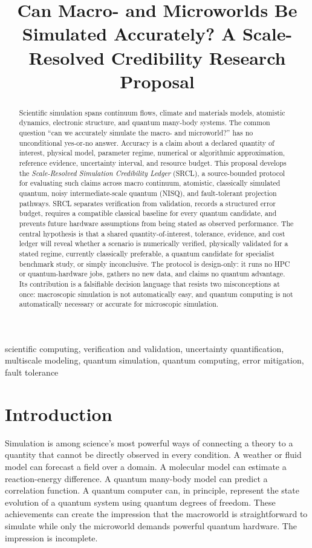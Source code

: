 \documentclass[conference]{../../../../Conference-LaTeX-template_10-17-19/IEEEtran}
\title{Can Macro- and Microworlds Be Simulated Accurately? A Scale-Resolved Credibility Research Proposal}
\author{\IEEEauthorblockN{Anonymous Research Proposal}}
\begin{document}
\maketitle

\begin{abstract}
Scientific simulation spans continuum flows, climate and materials models, atomistic dynamics, electronic structure, and quantum many-body systems. The common question ``can we accurately simulate the macro- and microworld?'' has no unconditional yes-or-no answer. Accuracy is a claim about a declared quantity of interest, physical model, parameter regime, numerical or algorithmic approximation, reference evidence, uncertainty interval, and resource budget. This proposal develops the \emph{Scale-Resolved Simulation Credibility Ledger} (SRCL), a source-bounded protocol for evaluating such claims across macro continuum, atomistic, classically simulated quantum, noisy intermediate-scale quantum (NISQ), and fault-tolerant projection pathways. SRCL separates verification from validation, records a structured error budget, requires a compatible classical baseline for every quantum candidate, and prevents future hardware assumptions from being stated as observed performance. The central hypothesis is that a shared quantity-of-interest, tolerance, evidence, and cost ledger will reveal whether a scenario is numerically verified, physically validated for a stated regime, currently classically preferable, a quantum candidate for specialist benchmark study, or simply inconclusive. The protocol is design-only: it runs no HPC or quantum-hardware jobs, gathers no new data, and claims no quantum advantage. Its contribution is a falsifiable decision language that resists two misconceptions at once: macroscopic simulation is not automatically easy, and quantum computing is not automatically necessary or accurate for microscopic simulation.
\end{abstract}

\begin{IEEEkeywords}
scientific computing, verification and validation, uncertainty quantification, multiscale modeling, quantum simulation, quantum computing, error mitigation, fault tolerance
\end{IEEEkeywords}

\section{Introduction}
Simulation is among science’s most powerful ways of connecting a theory to a quantity that cannot be directly observed in every condition. A weather or fluid model can forecast a field over a domain. A molecular model can estimate a reaction-energy difference. A quantum many-body model can predict a correlation function. A quantum computer can, in principle, represent the state evolution of a quantum system using quantum degrees of freedom. These achievements can create the impression that the macroworld is straightforward to simulate while only the microworld demands powerful quantum hardware. The impression is incomplete.
\end{document}
